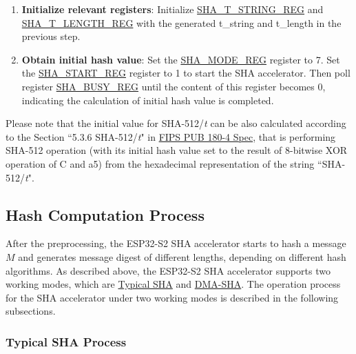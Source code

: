 \documentclass[main\_\_EN.tex]{subfiles}
\begin{document}
\begin{enumerate}
\begin{itemize}
        For example, if {\it{t}} = 231, then $t_0$ = 1, $t_1$ = 3, $t_2$ = 2, and $t\_string$ = $32'h32333180$.

    \end{itemize}
    \item \textbf{Initialize relevant registers}: Initialize \hyperref[regdesc:SHATSTRINGREG]{SHA\_T\_STRING\_REG} and  \hyperref[regdesc:SHATLENGTHREG]{SHA\_T\_LENGTH\_REG} with the generated t\_string and t\_length in the previous step.

    \item \textbf{Obtain initial hash value}: Set the \hyperref[regdesc:SHAMODEREG]{SHA\_MODE\_REG} register to 7. Set the \hyperref[regdesc:SHASTARTREG]{SHA\_START\_REG} register to 1 to start the SHA accelerator. Then poll register \hyperref[regdesc:SHABUSYREG]{SHA\_BUSY\_REG} until the content of this register becomes 0, indicating the calculation of initial hash value is completed.
\end{enumerate}

Please note that the initial value for SHA-512/{\it{t}} can be also calculated according to the Section ``5.3.6 SHA-512/{\it{t}}" in \href{https://doi.org/10.6028/NIST.FIPS.180-4}{FIPS PUB 180-4 Spec}, that is performing SHA-512 operation (with its initial hash value set to the result of 8-bitwise XOR operation of C and \hexprefix{}a5) from the hexadecimal representation of the string ``SHA-512/{\it{t}}".

\subsection{Hash Computation Process}\label{hashoperation}

After the preprocessing, the ESP32-S2 SHA accelerator starts to hash a message \begin{math}M\end{math} and generates message digest of different lengths, depending on different hash algorithms. As described above, the ESP32-S2 SHA accelerator supports two working modes, which are \hyperref[subsection:typicalsha]{Typical SHA} and \hyperref[subsection:dma-sha]{DMA-SHA}. The
operation process for the SHA accelerator under two working modes is described in the following subsections.

\subsubsection{Typical SHA Process}\label{subsection:typicalsha}
\end{document}
